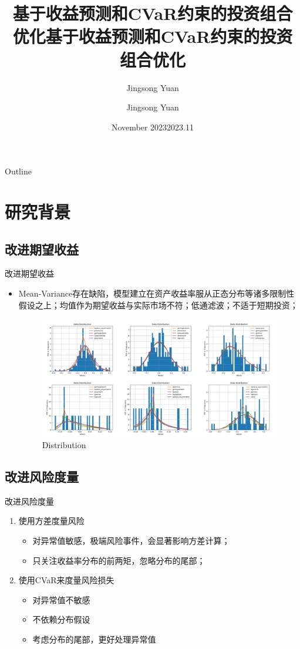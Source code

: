 \documentclass[CJK,aspectratio=169]{beamer}  %
\title{基于收益预测和CVaR约束的投资组合优化}
\author{Jingsong Yuan}
\date{November 2023}
\begin{document}
	\begin{frame}
		\title{基于收益预测和CVaR约束的投资组合优化}
		\author{Jingsong Yuan} %
		\date{2023.11}  %
		\titlepage
	\end{frame}
	\begin{frame}{Outline}
	\end{frame}
\section{研究背景}
\subsection{改进期望收益}
	\begin{frame}{改进期望收益}
			\begin{itemize}
				\item Mean-Variance存在缺陷，模型建立在资产收益率服从正态分布等诸多限制性假设之上；均值作为期望收益与实际市场不符；低通滤波；不适于短期投资；
			\begin{figure}
				\centering
				\includegraphics[width=0.9\linewidth]{"pic/distribution of random six"}
				\caption{Distribution}
				\label{fig:distribution-of-random-stock}
			\end{figure}
			\end{itemize}
	\end{frame}
\subsection{改进风险度量}
	\begin{frame}{改进风险度量}
		\begin{enumerate}
			\item 使用方差度量风险
			\begin{itemize}
				\item 对异常值敏感，极端风险事件，会显著影响方差计算；
				\item 只关注收益率分布的前两矩，忽略分布的尾部；
			\end{itemize}
			\item 使用CVaR来度量风险损失
			\begin{itemize}
				\item 对异常值不敏感
				\item 不依赖分布假设
				\item 考虑分布的尾部，更好处理异常值
			\end{itemize}
		\end{enumerate}
	\end{frame}
\end{document}
